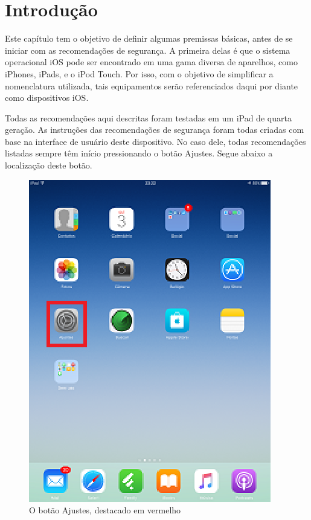 \chapter{Introdu\c c\~ao}

Este cap\'itulo tem o objetivo de definir algumas premissas b\'asicas, antes de se iniciar com as recomenda\c c\~oes de seguran\c ca. A primeira delas \'e que o sistema operacional iOS pode ser encontrado em uma gama diversa de aparelhos, como iPhones, iPads, e o iPod Touch. Por isso, com o objetivo de simplificar a nomenclatura utilizada, tais equipamentos ser\~ao referenciados daqui por diante como dispositivos iOS. 

Todas as recomenda\c c\~oes aqui descritas foram testadas em um iPad de quarta gera\c c\~ao. As instru\c c\~oes das recomenda\c c\~oes de seguran\c ca foram todas criadas com base na interface de usu\'ario deste dispositivo. No caso dele, todas recomenda\c c\~oes listadas sempre t\^em in\'icio pressionando o bot\~ao Ajustes. Segue abaixo a localiza\c c\~ao deste bot\~ao.

\begin{figure}[h]
  \centering
  \includegraphics{imagem1.eps}
  \caption{O bot\~ao Ajustes, destacado em vermelho}
\end{figure}

